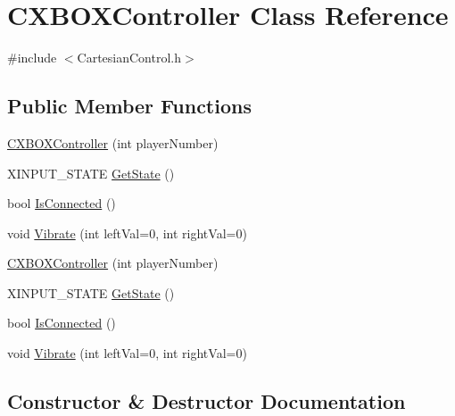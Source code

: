 \hypertarget{classCXBOXController}{}\section{C\+X\+B\+O\+X\+Controller Class Reference}
\label{classCXBOXController}


{\ttfamily \#include $<$Cartesian\+Control.\+h$>$}

\subsection*{Public Member Functions}
\begin{DoxyCompactItemize}
\item 
\hyperlink{classCXBOXController_a530d3ef7c7f3b06ea3f10f5ed6e2eaba}{C\+X\+B\+O\+X\+Controller} (int player\+Number)
\item 
X\+I\+N\+P\+U\+T\+\_\+\+S\+T\+A\+TE \hyperlink{classCXBOXController_a2d4f5ac4802cfa35ff8467103621aafa}{Get\+State} ()
\item 
bool \hyperlink{classCXBOXController_a9b7a69a50cf6ef90dc906404d2a66402}{Is\+Connected} ()
\item 
void \hyperlink{classCXBOXController_a204ba2403ea3e91fa95d78ae2479c83f}{Vibrate} (int left\+Val=0, int right\+Val=0)
\item 
\hyperlink{classCXBOXController_a530d3ef7c7f3b06ea3f10f5ed6e2eaba}{C\+X\+B\+O\+X\+Controller} (int player\+Number)
\item 
X\+I\+N\+P\+U\+T\+\_\+\+S\+T\+A\+TE \hyperlink{classCXBOXController_a2d4f5ac4802cfa35ff8467103621aafa}{Get\+State} ()
\item 
bool \hyperlink{classCXBOXController_a9b7a69a50cf6ef90dc906404d2a66402}{Is\+Connected} ()
\item 
void \hyperlink{classCXBOXController_a204ba2403ea3e91fa95d78ae2479c83f}{Vibrate} (int left\+Val=0, int right\+Val=0)
\end{DoxyCompactItemize}


\subsection{Constructor \& Destructor Documentation}
